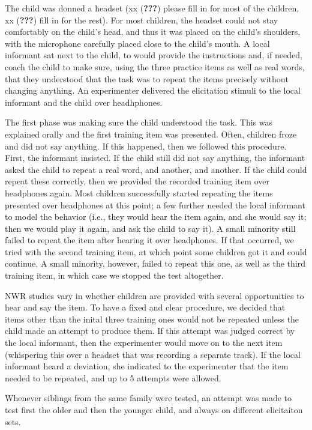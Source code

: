 \documentclass[english,,man,floatsintext]{apa6}
\begin{document}
The child was donned a headset (xx ({\textbf{???}}) please fill in for most of the children, xx ({\textbf{???}}) fill in for the rest). For most children, the headset could not stay comfortably on the child's head, and thus it was placed on the child's shoulders, with the microphone carefully placed close to the child's mouth. A local informant sat next to the child, to would provide the instructions and, if needed, coach the child to make sure, using the three practice items as well as real words, that they understood that the task was to repeat the items precisely without changing anything. An experimenter delivered the elicitation stimuli to the local informant and the child over headhphones.

The first phase was making sure the child understood the task. This was explained orally and the first training item was presented. Often, children froze and did not say anything. If this happened, then we followed this procedure. First, the informant insisted. If the child still did not say anything, the informant asked the child to repeat a real word, and another, and another. If the child could repeat these correctly, then we provided the recorded training item over headphones again. Most children successfully started repeating the items presented over headphones at this point; a few further needed the local informant to model the behavior (i.e., they would hear the item again, and she would say it; then we would play it again, and ask the child to say it). A small minority still failed to repeat the item after hearing it over headphones. If that occurred, we tried with the second training item, at which point some children got it and could continue. A small minority, however, failed to repeat this one, as well as the third training item, in which case we stopped the test altogether.

NWR studies vary in whether children are provided with several opportunities to hear and say the item. To have a fixed and clear procedure, we decided that items other than the inital three training ones would not be repeated unless the child made an attempt to produce them. If this attempt was judged correct by the local informant, then the experimenter would move on to the next item (whispering this over a headset that was recording a separate track). If the local informant heard a deviation, she indicated to the experimenter that the item needed to be repeated, and up to 5 attempts were allowed.

Whenever siblings from the same family were tested, an attempt was made to test first the older and then the younger child, and always on different elicitaiton sets.
\end{document}
